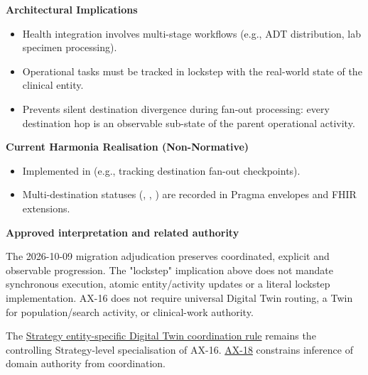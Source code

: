 \par\medskip\textbf{Architectural Implications}\par


\begin{itemize}


\item Health integration involves multi-stage workflows (e.g., ADT distribution, lab specimen processing).

\item Operational tasks must be tracked in lockstep with the real-world state of the clinical entity.

\item Prevents silent destination divergence during fan-out processing: every destination hop is an observable sub-state of the parent operational activity.

\end{itemize}


\par\medskip\textbf{Current Harmonia Realisation (Non-Normative)}\par


\begin{itemize}


\item Implemented in \texttt{} (e.g., \texttt{} tracking destination fan-out checkpoints).

\item Multi-destination statuses (\texttt{}, \texttt{}, \texttt{}) are recorded in Pragma envelopes and FHIR \texttt{} extensions.

\end{itemize}


\par\medskip\textbf{Approved interpretation and related authority}\par


The 2026-10-09 migration adjudication preserves coordinated, explicit and
observable progression. The "lockstep" implication above does not mandate
synchronous execution, atomic entity/activity updates or a literal lockstep
implementation. AX-16 does not require universal Digital Twin routing, a Twin
for population/search activity, or clinical-work authority.



The \href{\detokenize{../../../../../docs/markdown/02-strategy/strategic-views/logical-component-responsibilities.md#entity-specific-operational-coordination}}{Strategy entity-specific Digital Twin coordination rule}
remains the controlling Strategy-level specialisation of AX-16.
\hyperref[element:b8cafe3cf5904d2bb9a9767260fddf78]{AX-18} constrains inference of domain authority from coordination.


